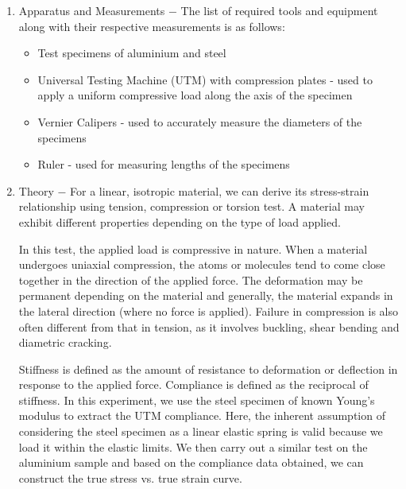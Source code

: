 \documentclass[a4paper, 11pt]{article}
\begin{document}
\begin{enumerate}[label=(\alph*)]
	\item { Apparatus and Measurements} $-$ The list of required tools and equipment along with their respective measurements is as follows:
\vspace{-2mm}

	\begin{itemize}
		\item Test specimens of aluminium and steel 
		\item Universal Testing Machine (UTM) with compression plates - used to apply a uniform compressive load along the axis of the specimen 
		\item Vernier Calipers - used to accurately measure the diameters of the specimens
		\item Ruler - used for measuring lengths of the specimens
	\end{itemize}
\item {Theory} $-$ For a linear, isotropic material, we can derive its stress-strain relationship using tension, compression or torsion test. A material may exhibit different properties depending on the type of load applied.
	
	In this test, the applied load is compressive in nature. When a material undergoes uniaxial compression, the atoms or molecules tend to come close together in the direction of the applied force. The deformation may be permanent depending on the material and generally, the material expands in the lateral direction (where no force is applied). Failure in compression is also often different from that in tension, as it involves buckling, shear bending and diametric cracking.
	
	Stiffness is defined as the amount of resistance to deformation or deflection in response to the applied force. Compliance is defined as the reciprocal of stiffness. In this experiment, we use the steel specimen of known Young's modulus to extract the UTM compliance. Here, the inherent assumption of considering the steel specimen as a linear elastic spring is valid because we load it within the elastic limits. We then carry out a similar test on the aluminium sample and based on the compliance data obtained, we can construct the true stress vs. true strain curve.


\end{enumerate}
\end{document}
